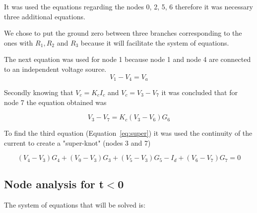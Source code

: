It was used the equations regarding the nodes 0, 2, 5, 6 therefore it was necessary three additional equations.

We chose to put the ground zero between three branches corresponding to the ones with $R_1, R_2$ and $R_3$ because it will facilitate the system of equations.

The next equation was used for node 1 because node 1 and node 4 are connected to an independent voltage source.
\begin{equation}
V_1-V_4=V_a 
\end{equation}

Secondly knowing that $V_c=K_c I_c$ and $V_c=V_3 - V_7$  it was concluded that for node 7 the equation obtained was

\begin{equation}
V_3 - V_7 = K_c (V_3 - V_6) G_6
\end{equation}

To find the third equation (Equation~\ref{eq:super}) it was used the continuity of the current to create a "super-knot" (nodes 3 and 7)

\begin{equation}
(V_4-V_3)G_4 + (V_0-V_3)G_3 +(V_5-V_3)G_5-I_d+(V_6-V_7)G_7=0
\label{eq:super}
\end{equation}



\subsection{Node analysis for t$<$0}

The system of equations that will be solved is:

